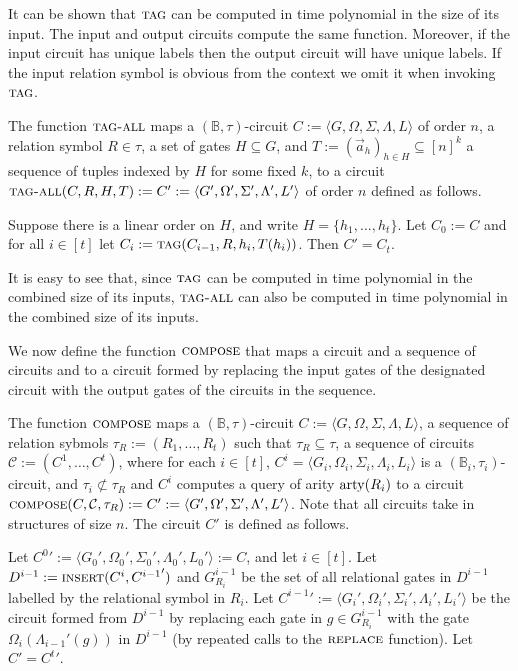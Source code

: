 \documentclass[../paper.tex]{subfiles}
\begin{document}
It can be shown that ${\normalfont\textsc{tag}}$ can be computed in time polynomial in the size
of its input. The input and output circuits compute the same function. Moreover,
if the input circuit has unique labels then the output circuit will have unique
labels. If the input relation symbol is obvious from the context we omit it when
invoking ${\normalfont\textsc{tag}}$.

\begin{definition}
  The function ${\normalfont\textsc{tag-all}}$ maps a $(\mathbb{B}, \tau)$-circuit $C := \langle
  G, \Omega, \Sigma, \Lambda, L \rangle$ of order $n$, a relation symbol $R \in
  \tau$, a set of gates $H \subseteq G$, and $T := (\vec{a}_h)_{h \in H}
  \subseteq [n]^{k}$ a sequence of tuples indexed by $H$ for some fixed $k$, to
  a circuit ${\normalfont\textsc{tag-all}}(C, R, H, T) := C' := \langle G', \Omega', \Sigma',
  \Lambda', L'\rangle$ of order $n$ defined as follows.

  Suppose there is a linear order on $H$, and write $H = \{h_1, \ldots, h_t\}$.
  Let $C_0 := C$ and for all $i \in [t]$ let $C_i := {\normalfont\textsc{tag}}(C_{i-1}, R, h_i,
  T(h_i))$. Then $C' = C_{t}$.
\end{definition}

It is easy to see that, since ${\normalfont\textsc{tag}}$ can be computed in time polynomial in
the combined size of its inputs, ${\normalfont\textsc{tag-all}}$ can also be computed in time
polynomial in the combined size of its inputs.

We now define the function ${\normalfont\textsc{compose}}$ that maps a circuit and a sequence of
circuits and to a circuit formed by replacing the input gates of the designated
circuit with the output gates of the circuits in the sequence.

\begin{definition}
  The function ${\normalfont\textsc{compose}}$ maps a $(\mathbb{B}, \tau)$-circuit $C := \langle
  G, \Omega, \Sigma, \Lambda, L \rangle$, a sequence of relation sybmols $\tau_R
  := (R_1, \ldots, R_t)$ such that $\tau_R \subseteq \tau$, a sequence of
  circuits $\mathcal{C} := ( C^1, \ldots, C^t)$, where for each $i \in [t]$,
  $C^i = \langle G_i, \Omega_i, \Sigma_i, \Lambda_i, L_i \rangle$ is a
  $(\mathbb{B}_i, \tau_i)$-circuit, and $\tau_i \not\subset \tau_R$ and $C^i$
  computes a query of arity $\mathrm{arty}(R_i)$ to a circuit ${\normalfont\textsc{compose}}(C,
  \mathcal{C}, \tau_R) := C' := \langle G', \Omega', \Sigma', \Lambda', L'
  \rangle$. Note that all circuits take in structures of size $n$. The circuit
  $C'$ is defined as follows.
  
  Let ${C^0}' := \langle G_0', \Omega_0', \Sigma_0', \Lambda_0', L_0' \rangle :=
  C$, and let $i \in [t]$. Let $D^{i-1}:= {\normalfont\textsc{insert}} (C^i, {C^{i-1}}')$ and
  $G^{i-1}_{R_i}$ be the set of all relational gates in $D^{i-1}$ labelled by
  the relational symbol in $R_i$. Let ${C^{i-1}}' := \langle G_i', \Omega_i',
  \Sigma_i', \Lambda_i', L_i' \rangle$ be the circuit formed from $D^{i-1}$ by
  replacing each gate in $g \in G^{i-1}_{R_i}$ with the gate
  $\Omega_{i}(\Lambda_{i-1}'(g))$ in $D^{i-1}$ (by repeated calls to the
  ${\normalfont\textsc{replace}}$ function). Let $C' = {C^{t}}'$.
\end{definition}
\end{document}
